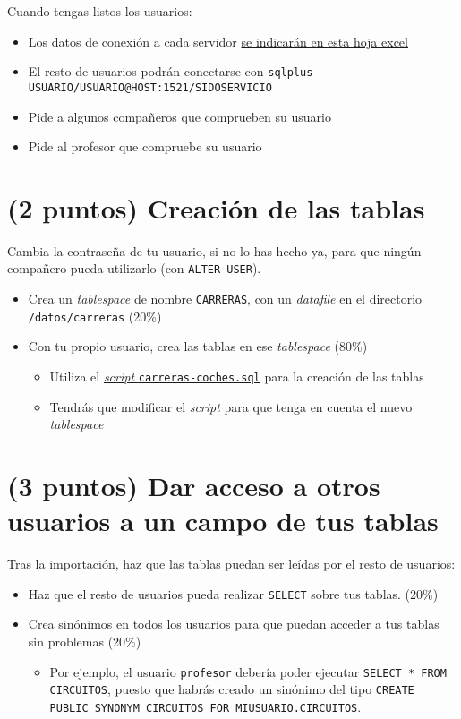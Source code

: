 \documentclass[a4paper]{article}
\begin{document}
Cuando tengas listos los usuarios:
\begin{itemize}
\item Los datos de conexión a cada servidor \href{https://docs.google.com/spreadsheets/d/17A6TpGOixGVVZr1VlocN6ZhMuKqmQjD3XedyIne4ows/edit\#gid=0}{se indicarán en esta hoja excel}
\item El resto de usuarios podrán conectarse con \texttt{sqlplus USUARIO/USUARIO@HOST:1521/SIDOSERVICIO}
\item Pide a algunos compañeros que comprueben su usuario
\item Pide al profesor que compruebe su usuario
\end{itemize}

\section{(2 puntos) Creación de las tablas}
\label{sec:org0000009}
Cambia la contraseña de tu usuario, si no lo has hecho ya, para que ningún compañero pueda utilizarlo (con \texttt{ALTER USER}).

\begin{itemize}
\item Crea un \emph{tablespace} de nombre \texttt{CARRERAS}, con un \emph{datafile} en el directorio \texttt{/datos/carreras} (20\%)
\item Con tu propio usuario, crea las tablas en ese \emph{tablespace} (80\%)
\begin{itemize}
\item Utiliza el \href{https://raw.githubusercontent.com/alvarogonzalezsotillo/apuntes-clase/gh-pages/sistemas-gestores-bbdd-asir2/apuntes/1/sql/carreras-coches.sql}{\emph{script} \texttt{carreras-coches.sql}} para la creación de las tablas
\item Tendrás que modificar el \emph{script} para que tenga en cuenta el nuevo \emph{tablespace}
\end{itemize}
\end{itemize}

\section{(3 puntos) Dar acceso a otros usuarios a un campo de tus tablas}
\label{sec:org000000c}
Tras la importación, haz que las tablas puedan ser leídas por el resto de usuarios:
\begin{itemize}
\item Haz que el resto de usuarios pueda realizar \texttt{SELECT} sobre tus tablas. (20\%)
\item Crea sinónimos en todos los usuarios para que puedan acceder a tus tablas sin problemas (20\%)
\begin{itemize}
\item Por ejemplo, el usuario \texttt{profesor} debería poder ejecutar \texttt{SELECT * FROM CIRCUITOS}, puesto que habrás creado un sinónimo del tipo \texttt{CREATE PUBLIC SYNONYM CIRCUITOS FOR MIUSUARIO.CIRCUITOS}.
\end{itemize}
\end{itemize}
\end{document}
